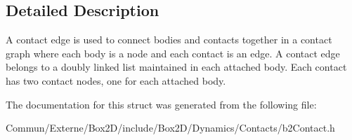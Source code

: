 \subsection{Detailed Description}
A contact edge is used to connect bodies and contacts together in a contact graph where each body is a node and each contact is an edge. A contact edge belongs to a doubly linked list maintained in each attached body. Each contact has two contact nodes, one for each attached body. 

The documentation for this struct was generated from the following file\+:\begin{DoxyCompactItemize}
\item 
Commun/\+Externe/\+Box2\+D/include/\+Box2\+D/\+Dynamics/\+Contacts/b2\+Contact.\+h\end{DoxyCompactItemize}
